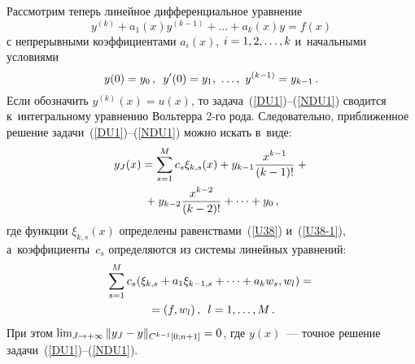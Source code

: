 \begin{multicols}{2}
Рассмотрим теперь линейное дифференциальное уравнение
\begin{equation}\label{DU1}
y^{(k)}+a_1(x)y^{(k-1)}+\dots +a_k(x)y=f(x)
\end{equation}
с непрерывными коэффициентами $a_i(x)$, $i\hm=1,2,\dots,k$ и~начальными условиями
\begin{equation}
\label{NDU1}
y(0)=y_0\,,\enskip y'(0)=y_1,\ \dots,\ y^{(k-1)}=y_{k-1}\,.
\end{equation}
Если обозначить $y^{(k)}(x)=u(x)$, то задача~(\ref{DU1})--(\ref{NDU1}) сводится 
к~интегральному уравнению Вольтерра \mbox{2-го} рода. Следовательно, 
приближенное решение задачи~(\ref{DU1})--(\ref{NDU1}) можно искать в~виде:
\begin{multline*}
y_J(x)=\sum\limits_{s=1}^M c_s {\xi}_{k,s}(x) +y_{k-1}\displaystyle\frac{\displaystyle x^{k-1}\mathstrut}{\displaystyle (k-1)!\mathstrut}+{}\\
{}+y_{k-2}\displaystyle\frac{\displaystyle x^{k-2}\mathstrut}{\displaystyle (k-2)!\mathstrut}+\dots+y_0\,,
\end{multline*}
где функции ${\xi}_{k,s}(x)$ определены равенствами~(\ref{U38})
и~(\ref{U38-1}), а~коэффициенты~$c_s$ 
определяются из системы линейных уравнений:
\begin{multline*}
\sum\limits_{s=1}^M c_s ({\xi}_{k,s}+a_1 {\xi}_{k-1,s}+\dots +a_k w_s,w_l)={}\\
{}=\left(f,w_l\right),\enskip l=1,\dots,M\,.
\end{multline*}
При этом $\lim\nolimits_{J\to +\infty} \|y_J\hm-y\|_{C^{k-1}[0;n+1]}\hm=0$, 
где $y(x)$~--- точное решение задачи~(\ref{DU1})--(\ref{NDU1}).




\end{multicols}
